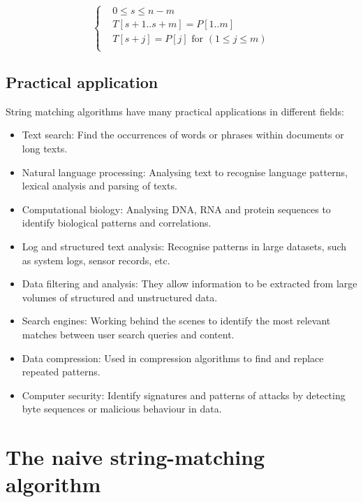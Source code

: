 \documentclass[11pt]{article}
\begin{document}
            \[
                \left\{
                \begin{aligned}
                    & 0 \leq s \leq n - m \\
                    & T[s+1..s+m] = P[1..m] \\
                    & T[s+j] = P[j] \text{ for } (1 \leq j \leq m) \\
                \end{aligned}
                \right.
            \]

        \subsection{Practical application} \label{subsec:practical_application}

            String matching algorithms have many practical applications in different fields:
            \begin{itemize}
                \item Text search: Find the occurrences of words or phrases within documents or long texts.
                \item Natural language processing: Analysing text to recognise language patterns, lexical analysis and parsing of texts.
                \item Computational biology: Analysing DNA, RNA and protein sequences to identify biological patterns and correlations.
                \item Log and structured text analysis: Recognise patterns in large datasets, such as system logs, sensor records, etc.
                \item Data filtering and analysis: They allow information to be extracted from large volumes of structured and unstructured data.
                \item Search engines: Working behind the scenes to identify the most relevant matches between user search queries and content.
                \item Data compression: Used in compression algorithms to find and replace repeated patterns.
                \item Computer security: Identify signatures and patterns of attacks by detecting byte sequences or malicious behaviour in data.
            \end{itemize}

    \newpage

    \section{The naive string-matching algorithm} \label{sec:naive_string_matching_algorithm}
\end{document}
